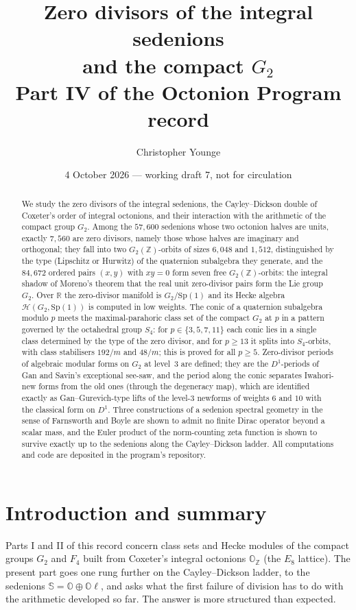 \documentclass[11pt]{amsart}
\title[Zero divisors of the integral sedenions]{Zero divisors of the integral sedenions\\ and the compact $G_2$\\[4pt] {\normalsize Part IV of the Octonion Program record}}
\author{Christopher Younge}
\date{4 October 2026 --- working draft 7, not for circulation}
\theoremstyle{definition}
\renewcommand{\O}{\mathbb{O}}\newcommand{\Sd}{\mathbb{S}}\newcommand{\Hq}{\mathbb{H}}\newcommand{\Z}{\mathbb{Z}}\newcommand{\Q}{\mathbb{Q}}\newcommand{\R}{\mathbb{R}}\newcommand{\C}{\mathbb{C}}\newcommand{\F}{\mathbb{F}}
\begin{document}
\begin{abstract}
We study the zero divisors of the integral sedenions, the Cayley--Dickson double of Coxeter's order of integral octonions, and their interaction with the arithmetic of the compact group $G_2$. Among the $57{,}600$ sedenions whose two octonion halves are units, exactly $7{,}560$ are zero divisors, namely those whose halves are imaginary and orthogonal; they fall into two $G_2(\Z)$-orbits of sizes $6{,}048$ and $1{,}512$, distinguished by the type (Lipschitz or Hurwitz) of the quaternion subalgebra they generate, and the $84{,}672$ ordered pairs $(x,y)$ with $xy=0$ form seven free $G_2(\Z)$-orbits: the integral shadow of Moreno's theorem that the real unit zero-divisor pairs form the Lie group $G_2$. Over $\R$ the zero-divisor manifold is $G_2/\mathrm{Sp}(1)$ and its Hecke algebra $\mathcal H(G_2,\mathrm{Sp}(1))$ is computed in low weights. The conic of a quaternion subalgebra modulo $p$ meets the maximal-parahoric class set of the compact $G_2$ at $p$ in a pattern governed by the octahedral group $S_4$: for $p\in\{3,5,7,11\}$ each conic lies in a single class determined by the type of the zero divisor, and for $p\ge 13$ it splits into $S_4$-orbits, with class stabilisers $192/m$ and $48/m$; this is proved for all $p\ge 5$. Zero-divisor periods of algebraic modular forms on $G_2$ at level~3 are defined; they are the $D^1$-periods of Gan and Savin's exceptional see-saw, and the period along the conic separates Iwahori-new forms from the old ones (through the degeneracy map), which are identified exactly as Gan--Gurevich-type lifts of the level-$3$ newforms of weights $6$ and $10$ with the classical form on $D^1$. Three constructions of a sedenion spectral geometry in the sense of Farnsworth and Boyle are shown to admit no finite Dirac operator beyond a scalar mass, and the Euler product of the norm-counting zeta function is shown to survive exactly up to the sedenions along the Cayley--Dickson ladder. All computations and code are deposited in the program's repository.
\end{abstract}
\maketitle
\tableofcontents

\section{Introduction and summary}
Parts I and II of this record \cite{PartI,PartII} concern class sets and Hecke modules of the compact groups $G_2$ and $F_4$ built from Coxeter's integral octonions $\O_\Z$ (the $E_8$ lattice). The present part goes one rung further on the Cayley--Dickson ladder, to the sedenions $\Sd=\O\oplus\O\ell$, and asks what the first failure of division has to do with the arithmetic developed so far. The answer is more structured than expected.
\end{document}
